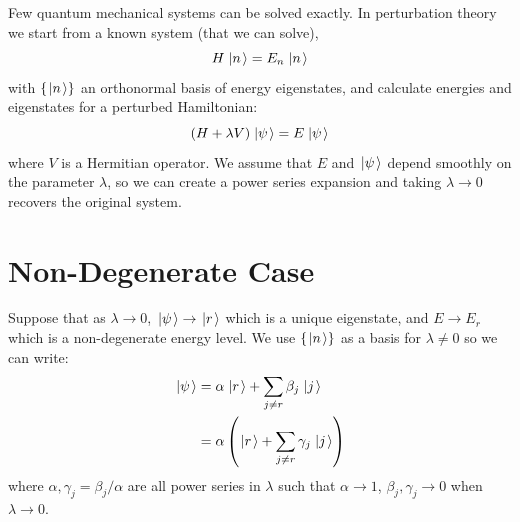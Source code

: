 \documentclass[../Main.tex]{subfiles}
\begin{document}
Few quantum mechanical systems can be solved exactly. In perturbation theory we start from a known system (that we can solve),
\begin{equation*}
    H\left.\left|n\right.\right\rangle = E_n \left.\left|n\right.\right\rangle
\end{equation*}
with $\{\left.\left|n\right.\right\rangle\}$ an orthonormal basis of energy eigenstates, and calculate energies and eigenstates for a perturbed Hamiltonian:
\begin{equation}
    (H + \lambda V) \left.\left|\psi\right.\right\rangle = E\left.\left|\psi\right.\right\rangle
    \label{eqnPerturbedH}
\end{equation}
where $V$ is a Hermitian operator. We assume that $E$ and $\left.\left|\psi\right.\right\rangle$ depend smoothly on the parameter $\lambda$, so we can create a power series expansion and taking $\lambda \to 0$ recovers the original system.
\section{Non-Degenerate Case}
Suppose that as $\lambda \to 0$, $\left.\left|\psi\right.\right\rangle \to \left.\left|r\right.\right\rangle$ which is a unique eigenstate, and $E \to E_r$ which is a non-degenerate energy level.
We use $\{\left.\left|n\right.\right\rangle\}$ as a basis for $\lambda \neq 0$ so we can write:
\begin{align*}
    \left.\left|\psi\right.\right\rangle &= \alpha \left.\left|r\right.\right\rangle + \sum_{j \neq r} \beta_j \left.\left|j\right.\right\rangle \\
    &= \alpha \left(\left.\left|r\right.\right\rangle + \sum_{j \neq r} \gamma_j \left.\left|j\right.\right\rangle\right)
\end{align*}
where $\alpha, \gamma_j = \beta_j / \alpha$ are all power series in $\lambda$ such that $\alpha \to 1$, $\beta_j, \gamma_j \to 0$ when $\lambda \to 0$.
\end{document}
